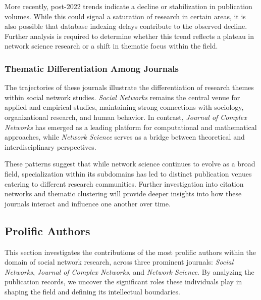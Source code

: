 \documentclass[twocolumn]{article}
\begin{document}
	More recently, post-2022 trends indicate a decline or stabilization in publication volumes. While this could signal a saturation of research in certain areas, it is also possible that database indexing delays contribute to the observed decline. Further analysis is required to determine whether this trend reflects a plateau in network science research or a shift in thematic focus within the field.
	
	\subsubsection*{Thematic Differentiation Among Journals}
	
	The trajectories of these journals illustrate the differentiation of research themes within social network studies. \textit{Social Networks} remains the central venue for applied and empirical studies, maintaining strong connections with sociology, organizational research, and human behavior. In contrast, \textit{Journal of Complex Networks} has emerged as a leading platform for computational and mathematical approaches, while \textit{Network Science} serves as a bridge between theoretical and interdisciplinary perspectives.
	
	These patterns suggest that while network science continues to evolve as a broad field, specialization within its subdomains has led to distinct publication venues catering to different research communities. Further investigation into citation networks and thematic clustering will provide deeper insights into how these journals interact and influence one another over time.
	
	
	\subsection{Prolific Authors}\label{Prolific Authors}
	
	This section investigates the contributions of the most prolific authors within the domain of social network research, across three prominent journals: \textit{Social Networks}, \textit{Journal of Complex Networks}, and \textit{Network Science}. By analyzing the publication records, we uncover the significant roles these individuals play in shaping the field and defining its intellectual boundaries.
	
\end{document}

